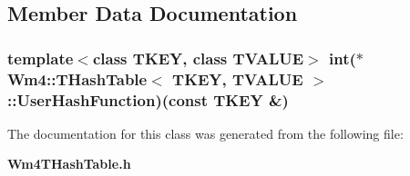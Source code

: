 \subsection{Member Data Documentation}
\subsubsection{\setlength{\rightskip}{0pt plus 5cm}template$<$class TKEY, class TVALUE$>$ int($\ast$ {\bf Wm4::THash\-Table}$<$ TKEY, TVALUE $>$::{\bf User\-Hash\-Function})(const TKEY \&)}\label{classWm4_1_1THashTable_e3d78c4cd8804bdd07b0f8dec64efd7b}




The documentation for this class was generated from the following file:\begin{CompactItemize}
\item 
{\bf Wm4THash\-Table.h}\end{CompactItemize}
